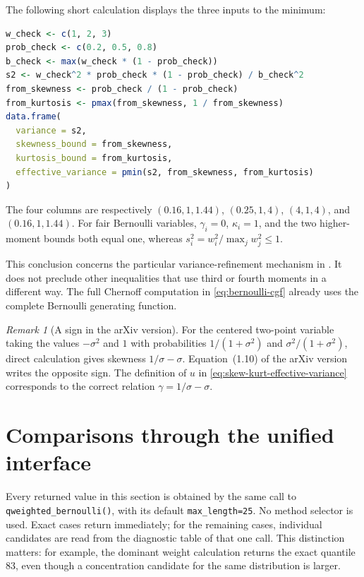 \documentclass[11pt,letterpaper]{article}
\numberwithin{equation}{section}
\theoremstyle{definition}
\theoremstyle{remark}
\newtheorem{remark}[theorem]{Remark}
\begin{document}
The following short calculation displays the three inputs to the minimum:
\begin{lstlisting}[language=R]
w_check <- c(1, 2, 3)
prob_check <- c(0.2, 0.5, 0.8)
b_check <- max(w_check * (1 - prob_check))
s2 <- w_check^2 * prob_check * (1 - prob_check) / b_check^2
from_skewness <- prob_check / (1 - prob_check)
from_kurtosis <- pmax(from_skewness, 1 / from_skewness)
data.frame(
  variance = s2,
  skewness_bound = from_skewness,
  kurtosis_bound = from_kurtosis,
  effective_variance = pmin(s2, from_skewness, from_kurtosis)
)
\end{lstlisting}
The four columns are respectively
$(0.16,1,1.44)$, $(0.25,1,4)$, $(4,1,4)$, and $(0.16,1,1.44)$.
For fair Bernoulli variables, $\gamma_i=0$, $\kappa_i=1$, and the two
higher-moment bounds both equal one, whereas
$s_i^2=w_i^2/\max_jw_j^2\le1$.

This conclusion concerns the particular variance-refinement mechanism in
\cite{bentkusjuskevicius2008}. It does not preclude other inequalities that
use third or fourth moments in a different way. The full Chernoff computation
in \eqref{eq:bernoulli-cgf} already uses the complete Bernoulli generating
function.

\begin{remark}[A sign in the arXiv version]
For the centered two-point variable taking the values $-\sigma^2$ and $1$
with probabilities $1/(1+\sigma^2)$ and $\sigma^2/(1+\sigma^2)$, direct
calculation gives skewness $1/\sigma-\sigma$. Equation~(1.10) of the arXiv
version writes the opposite sign. The definition of $u$ in
\eqref{eq:skew-kurt-effective-variance} corresponds to the correct relation
$\gamma=1/\sigma-\sigma$.
\end{remark}

\section{Comparisons through the unified interface}
\label{sec:comparisons}

Every returned value in this section is obtained by the same call to
\texttt{qweighted\_bernoulli()}, with its default \texttt{max\_length=25}.
No method selector is used. Exact cases return immediately; for the
remaining cases, individual candidates are read from the diagnostic table
of that one call. This distinction matters: for example, the dominant
weight calculation returns the exact quantile 83, even though a
concentration candidate for the same distribution is larger.
\end{document}
